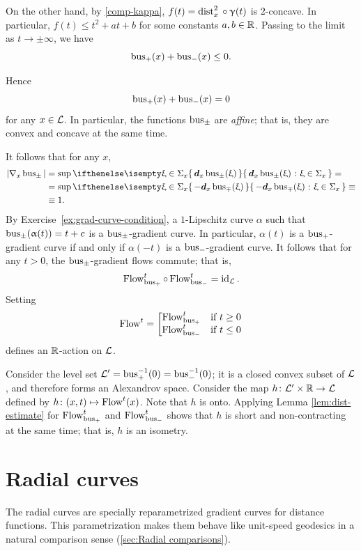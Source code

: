 On the other hand, by \ref{comp-kappa}, 
$f(t)=\distfun[2]{x}{}{}\circ\gamma(t)$ 
is $2$-concave.
In particular, $f(t)\le t^2+at+b$ for some constants $a,b\in\RR$. 
Passing to the limit as $t\to\pm\infty$, we have \[\bus_+(x)+\bus_-(x)\le0.\]

Hence
\[
\mathop{\rm bus}\nolimits_+(x)+\mathop{\rm bus}\nolimits_-(x)= 0
\]
for any $x\in \spc{L}$.
In particular, the functions $\mathop{\rm bus}\nolimits_\pm$ are \emph{affine};
that is, they are convex and concave at the same time.

It follows that for any $x$,
\begin{align*}
|\nabla_x \bus_\pm|
&=\sup\set{\dd_x\bus_\pm(\xi)}{\xi\in\Sigma_x}=
\\
&=\sup\set{-\dd_x\bus_\mp(\xi)}{\xi\in\Sigma_x}\equiv
\\
&\equiv1.
\end{align*}
By Exercise~\ref{ex:grad-curve-condition}, a 
$1$-Lipschitz curve $\alpha$ such that $\mathop{\rm bus}\nolimits_\pm(\upalpha(t))=t+c$ is a $\mathop{\rm bus}\nolimits_\pm$-gradient curve. 
In particular, $\alpha(t)$ is a $\mathop{\rm bus}\nolimits_+$-gradient curve if and only if $\alpha(-t)$ is a $\mathop{\rm bus}\nolimits_-$-gradient curve.
It follows that for any $t>0$, the $\mathop{\rm bus}\nolimits_\pm$-gradient flows commute;
that is, 
\[\GF_{\bus_+}^t\circ\GF_{\bus_-}^t=\id_\spc{L}.\]
Setting
\[\GF^t=\left[\begin{matrix}
\GF_{\bus_+}^t&\hbox{if}\ t\ge0\\
\GF_{\bus_-}^t&\hbox{if}\ t\le0
               \end{matrix}\right.\]
defines an $\mathbb{R}$-action on $\mathcal{L}$.

Consider the level set $\mathcal{L}'=\mathop{\rm bus}\nolimits_+^{-1}(0)=\mathop{\rm bus}\nolimits_-^{-1}(0)$;
it is a closed convex subset of $\mathcal{L}$, and therefore forms an Alexandrov space.
Consider the map $h\:\spc{L}'\times \RR\to \spc{L}$ defined by $h\:(x,t)\mapsto \GF^t(x)$.
Note that $h$ is onto.
Applying Lemma \ref{lem:dist-estimate} for $\mathop{\rm Flow}\nolimits_{\mathop{\rm bus}\nolimits_+}^t$ and $\mathop{\rm Flow}\nolimits_{\mathop{\rm bus}\nolimits_-}^t$ shows that $h$ is short and non-contracting at the same time; that is, $h$ is an isometry.
\qeds



\section{Radial curves}\label{sec:Radial curves: definition}

The radial curves are specially reparametrized gradient curves for distance functions.
This parametrization makes them behave like unit-speed geodesics in a natural comparison sense (\ref{sec:Radial comparisons}).

